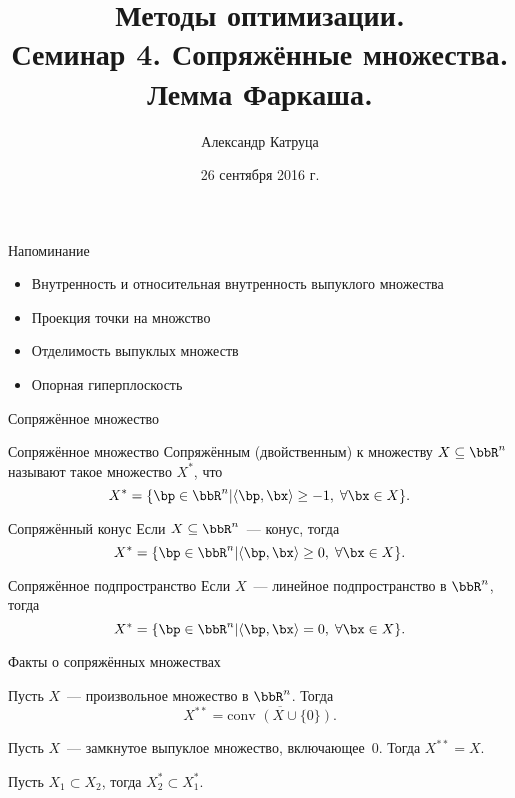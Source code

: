 \documentclass[12pt]{beamer}
\title[Семинар 4]{Методы оптимизации. \\
 Семинар 4. Сопряжённые множества. Лемма Фаркаша.}
\author{Александр Катруца}
\institute{Московский физико-технический институт,\\
Факультет Управления и Прикладной Математики}
\date{26 сентября 2016 г.}
\begin{document}
\begin{frame}
\maketitle
\end{frame}

\begin{frame}{Напоминание}
\begin{itemize}
\item Внутренность и относительная внутренность выпуклого множества
\item Проекция точки на множство
\item Отделимость выпуклых множеств
\item Опорная гиперплоскость
\end{itemize}
\end{frame}

\begin{frame}{Сопряжённое множество}
\begin{block}{Сопряжённое множество}
Сопряжённым (двойственным) к множеству $X \subseteq \bbR^n$ называют такое множество $X^*$, что
\vspace{-4mm}
\[
X^* = \{ \bp \in \bbR^n | \langle \bp, \bx \rangle \geq -1, \; \forall \bx \in X \}.
\]
\end{block}

\begin{block}{Сопряжённый конус}
Если $X \subseteq \bbR^n$~--- конус, тогда
\vspace{-4mm} 
\[
X^* = \{ \bp \in \bbR^n | \langle \bp, \bx \rangle \geq 0, \; \forall \bx \in X \}.
\]
\end{block}

\begin{block}{Сопряжённое подпространство}
Если $X$~--- линейное подпространство в $\bbR^n$, тогда 
\vspace{-4mm} 
\[
X^* = \{ \bp \in \bbR^n | \langle \bp, \bx \rangle = 0, \; \forall \bx \in X \}.
\]
\end{block}
\end{frame}

\begin{frame}{Факты о сопряжённых множествах}
\begin{theorem}
Пусть $X$~--- произвольное множество в $\bbR^n$. Тогда
\vspace{-4mm}
\[
X^{**} = \overline{\text{conv }(X \cup \{0\})}.
\] 
\end{theorem}

\begin{theorem}
Пусть $X$~--- замкнутое выпуклое множество, включающее~0. Тогда $X^{**} = X$.
\end{theorem}

\begin{theorem}
Пусть $X_1 \subset X_2$, тогда $X^*_2 \subset X^*_1$.
\end{theorem}
\end{frame}
\end{document}
